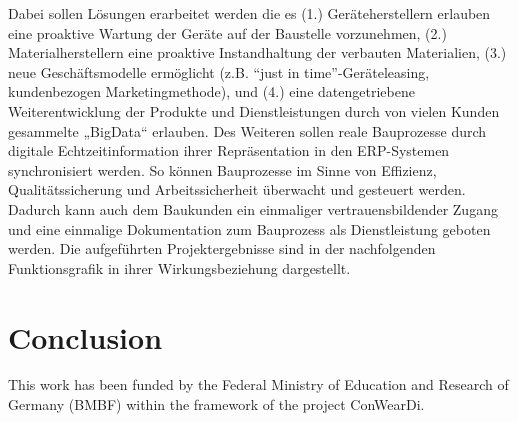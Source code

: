 Dabei sollen Lösungen erarbeitet werden die es (1.) Geräteherstellern erlauben eine proaktive Wartung der Geräte auf der Baustelle vorzunehmen, (2.) Materialherstellern eine proaktive Instandhaltung der verbauten Materialien, (3.) neue Geschäftsmodelle ermöglicht (z.B. “just in time”-Geräteleasing, kundenbezogen Marketingmethode), und (4.) eine datengetriebene Weiterentwicklung der Produkte und Dienstleistungen durch von vielen Kunden gesammelte „BigData“ erlauben. Des Weiteren sollen reale Bauprozesse durch digitale Echtzeitinformation ihrer Repräsentation in den ERP-Systemen synchronisiert werden. So können Bauprozesse im Sinne von Effizienz, Qualitätssicherung und Arbeitssicherheit überwacht und gesteuert werden. Dadurch kann auch dem Baukunden ein einmaliger vertrauensbildender Zugang und eine einmalige Dokumentation zum Bauprozess als Dienstleistung geboten werden.
Die aufgeführten Projektergebnisse sind in der nachfolgenden Funktionsgrafik in ihrer Wirkungsbeziehung dargestellt.


\section{Conclusion}


\begin{acks}
  This work has been funded by the Federal Ministry of Education and Research of Germany (BMBF) within the framework of the project ConWearDi.
\end{acks}
